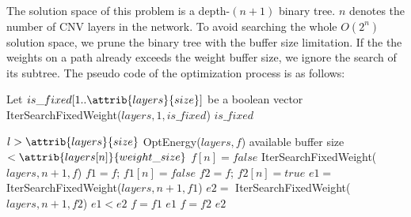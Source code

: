 The solution space of this problem is a depth-$(n+1)$ binary tree. $n$ denotes the number of CNV layers in the network. To avoid searching the whole $O(2^n)$ solution space, we prune the binary tree with the buffer size limitation. If the the weights on a path already exceeds the weight buffer size, we ignore the search of its subtree. The pseudo code of the optimization process is as follows:

\begin{codebox}
\li Let $is\_fixed[1 .. \attrib{layers}{size}]$ be a boolean vector
\li IterSearchFixedWeight($layers, 1, is\_fixed$)
\li \Return $is\_fixed$
\end{codebox}

\begin{codebox}
\li \If $l > \attrib{layers}{size}$
\li	\Do
     \Return OptEnergy($layers, f$)
  \End
\li \If available buffer size $< \attrib{layers[n]}{weight\_size}$
\li	\Do
     $f[n] = false$
\li 	\Return IterSearchFixedWeight($layers, n+1, f$)
  \End
\li $f1 = f$; $f1[n] = false$
\li $f2 = f$; $f2[n] = true$
\li $e1 =$ IterSearchFixedWeight($layers, n+1, f1$)
\li $e2 =$ IterSearchFixedWeight($layers, n+1, f2$)
\li \If $e1 < e2$
\li	\Do
     $f = f1$
\li 	\Return $e1$
\li	\Else
\li 	$f = f2$
\li 	\Return $e2$
  \End
\end{codebox}